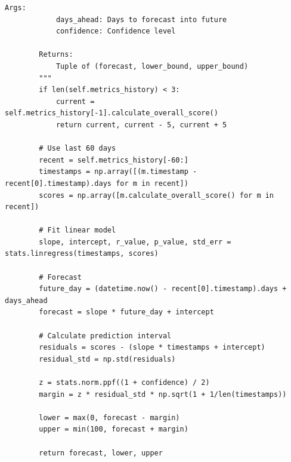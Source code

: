 \begin{lstlisting}[style=python, caption={Comprehensive project health metrics framework with 15+ dimensions}]
        Args:
            days_ahead: Days to forecast into future
            confidence: Confidence level

        Returns:
            Tuple of (forecast, lower_bound, upper_bound)
        """
        if len(self.metrics_history) < 3:
            current = self.metrics_history[-1].calculate_overall_score()
            return current, current - 5, current + 5

        # Use last 60 days
        recent = self.metrics_history[-60:]
        timestamps = np.array([(m.timestamp - recent[0].timestamp).days for m in recent])
        scores = np.array([m.calculate_overall_score() for m in recent])

        # Fit linear model
        slope, intercept, r_value, p_value, std_err = stats.linregress(timestamps, scores)

        # Forecast
        future_day = (datetime.now() - recent[0].timestamp).days + days_ahead
        forecast = slope * future_day + intercept

        # Calculate prediction interval
        residuals = scores - (slope * timestamps + intercept)
        residual_std = np.std(residuals)

        z = stats.norm.ppf((1 + confidence) / 2)
        margin = z * residual_std * np.sqrt(1 + 1/len(timestamps))

        lower = max(0, forecast - margin)
        upper = min(100, forecast + margin)

        return forecast, lower, upper



\end{lstlisting}
